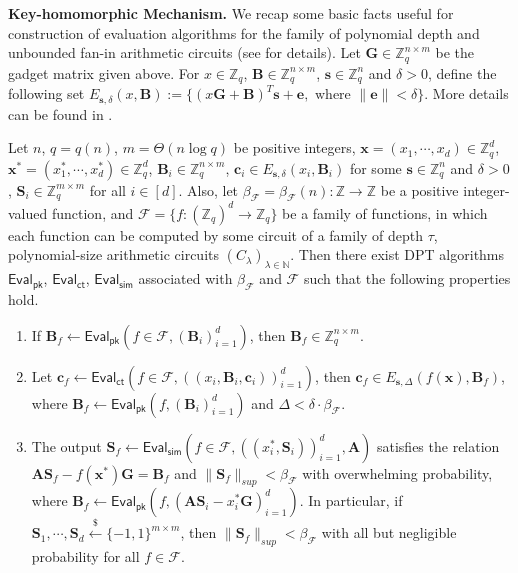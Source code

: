 \documentclass[runningheads,10pt]{llncs}
\begin{document}
\noindent \textbf{Key-homomorphic Mechanism.} 
We recap some basic facts useful for construction of 
evaluation algorithms for the family of polynomial depth and unbounded fan-in arithmetic circuits
(see  \cite[Section 4]{BGG+14} for details).
Let $\textbf{G}\in \mathbb{Z}_q^{n\times m}$ be the gadget matrix given above.    
For $x\in \mathbb{Z}_q$, $\textbf{B} \in \mathbb{Z}_q^{n\times m}$, $\textbf{s} \in \mathbb{Z}_q^{n}$ and $\delta>0$, 
define the following set
$ E_{\textbf{s},\delta}(x, \textbf{B}):=\{(x\textbf{G}+\textbf{B})^T\textbf{s}+\textbf{e}, \text{ where } \| \textbf{e}\|<\delta\}.$ More details can be found in  \cite{BGG+14}.

\begin{lemma}\label{eval} 
Let $n$, $q=q(n)$, $m=\Theta(n\log q)$ be positive integers,  
	$\mathbf{x}=(x_1, \cdots, x_d) \in \mathbb{Z}_q^d$, 
	$\mathbf{x}^*=(x_1^*, \cdots, x^*_d) \in \mathbb{Z}_q^d$, $\mathbf{B}_i\in \mathbb{Z}_q^{n\times m}$, 
	$\mathbf{c}_i \in E_{\mathbf{s},\delta}(x_i, \mathbf{B}_i)$ for some $\mathbf{s}\in \mathbb{Z}_q^n$ 
	and $\delta>0$, $ \mathbf{S}_i \in \mathbb{Z}_q^{m\times m}$ for all $i\in [d]$. Also, let $\beta_{\mathcal{F}}=\beta_{\mathcal{F}}(n):\mathbb{Z} \rightarrow \mathbb{Z}$ be a positive integer-valued function, and   
		$\mathcal{F}=\{f:(\mathbb{Z}_q)^d \rightarrow \mathbb{Z}_q\}$ be a family of functions, in which each function can be computed by some circuit of a family of depth $\tau$, polynomial-size arithmetic circuits $(C_{\lambda})_{\lambda\in \mathbb{N}}$. 
	Then there exist DPT algorithms $\mathsf{Eval}_\mathsf{pk}$,   $\mathsf{Eval}_\mathsf{ct}$,  
	$ \mathsf{Eval}_\mathsf{sim}$  associated with $\beta_{\mathcal{F}}$ and $\mathcal{F}$  such that the following properties hold.
	\begin{enumerate}
		\item If $\mathbf{B}_f \leftarrow \mathsf{Eval}_\mathsf{pk}(f\in \mathcal{F}, (\mathbf{B}_i )_{i=1}^d )$, 
		then  $\mathbf{B}_f\in \mathbb{Z}_q^{n\times m}$.
		\item Let $\mathbf{c}_f \leftarrow \mathsf{Eval}_\mathsf{ct}(f\in \mathcal{F}, ((x_i, \mathbf{B}_i,\mathbf{c}_i))_{i=1}^d)$, 
		then $\mathbf{c}_f \in E_{\mathbf{s},\Delta}(f(\mathbf{x}), \mathbf{B}_f)$, 
		where $\mathbf{B}_f \leftarrow \mathsf{Eval}_\mathsf{pk}(f, (\mathbf{B}_i)_{i=1}^d)$ and $\Delta < \delta \cdot \beta_{\mathcal{F}}.$
		\item The output $\mathbf{S}_f \leftarrow \mathsf{Eval}_\mathsf{sim}(f\in \mathcal{F}, ((x_i^*,\mathbf{S}_i))_{i=1}^d, \mathbf{A})$ satisfies the relation
		$\mathbf{A}\mathbf{S}_f-f(\mathbf{x}^*)\mathbf{G}=\mathbf{B}_f$ 
		and $\|\mathbf{S}_f \|_{sup} <\beta_{\mathcal{F}}$ with overwhelming probability,  
		where  $\mathbf{B}_f \leftarrow \mathsf{Eval}_\mathsf{pk}(f, (\mathbf{A}\mathbf{S}_i-x_i^*\mathbf{G})_{i=1}^d) $. 
		In particular, if $\mathbf{S}_1,\cdots, \mathbf{S}_d \xleftarrow{\$} \{-1,1\}^{m\times m}$, 
		then $\|\mathbf{S}_f \|_{sup} <\beta_{\mathcal{F}}$ with all but negligible probability for all $f\in \mathcal{F}$.
	\end{enumerate}
\end{lemma}
\end{document}

